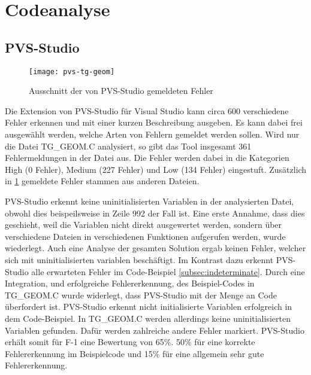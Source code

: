 \section{Codeanalyse}
\label{sec:codeanalyse}

\subsection{PVS-Studio}

\begin{figure}[htpb]
  \centering
  \texttt{[image: pvs-tg-geom]}
  \caption{Ausschnitt der von PVS-Studio gemeldeten Fehler}
  \label{img:pvs-tg-geom}
\end{figure}

Die Extension von PVS-Studio für Visual Studio kann circa 600 verschiedene Fehler erkennen und mit einer kurzen Beschreibung ausgeben. Es kann dabei frei ausgewählt werden, welche Arten von
Fehlern gemeldet werden sollen. \newline
Wird nur die Datei \glqq{}TG\_GEOM.C\grqq{} analysiert, so gibt das Tool insgesamt 361 Fehlermeldungen in der Datei aus. Die Fehler werden dabei in die Kategorien \glqq{}High\grqq{}
(0 Fehler), \glqq{}Medium\grqq{} (227 Fehler) und \glqq{}Low\grqq{} (134 Fehler) eingestuft. Zusätzlich in \ref{img:pvs-tg-geom} gemeldete Fehler stammen aus anderen Dateien.

PVS-Studio erkennt keine uninitialisierten Variablen in der analysierten Datei, obwohl dies beispeilsweise in Zeile 992 der Fall ist. Eine erste Annahme, dass dies geschieht, weil die
Variablen nicht direkt ausgewertet werden, sondern über verschiedene Dateien in verschiedenen Funktionen aufgerufen werden, wurde wiederlegt. Auch eine Analyse der gesamten Solution
ergab keinen Fehler, welcher sich mit uninitialisierten variablen beschäftigt. \newline
Im Kontrast dazu erkennt PVS-Studio alle erwarteten Fehler im Code-Beispiel \ref{subsec:indeterminate}. Durch eine Integration, und erfolgreiche Fehlererkennung, des Beispiel-Codes in
\glqq{}TG\_GEOM.C\grqq{} wurde widerlegt, dass PVS-Studio mit der Menge an Code überfordert ist. \newline
PVS-Studio erkennt nicht initialisierte Variablen erfolgreich in dem Code-Beispiel. In \glqq{}TG\_GEOM.C\grqq{} werden allerdings keine uninitialisierten Variablen gefunden. Dafür
werden zahlreiche andere Fehler markiert. PVS-Studio erhält somit für F-1 eine Bewertung von 65\%. 50\% für eine korrekte Fehlererkennung im Beispielcode und 15\% für eine allgemein
sehr gute Fehlererkennung.

